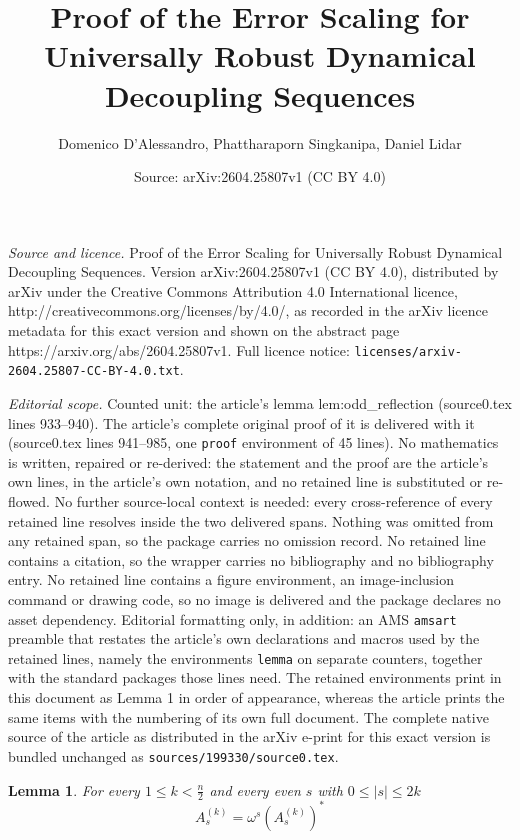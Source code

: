\documentclass[10pt,a4paper]{amsart}
\title{Proof of the Error Scaling for Universally Robust Dynamical Decoupling Sequences}
\author{Domenico D'Alessandro, Phattharaporn Singkanipa, Daniel Lidar}
\date{Source: arXiv:2604.25807v1 (CC BY 4.0)}
\newtheorem{lemma}{Lemma}
\newcommand{\beq}{\begin{equation}}
\newcommand{\eeq}{\end{equation}}
\begin{document}
\maketitle

\noindent\emph{Source and licence.} Proof of the Error Scaling for Universally Robust Dynamical Decoupling Sequences. Version arXiv:2604.25807v1 (CC BY 4.0), distributed by arXiv under the Creative Commons Attribution 4.0 International licence, http://creativecommons.org/licenses/by/4.0/, as recorded in the arXiv licence metadata for this exact version and shown on the abstract page https://arxiv.org/abs/2604.25807v1. Full licence notice: \texttt{licenses/arxiv-2604.25807-CC-BY-4.0.txt}.\par\smallskip

\noindent\textit{Editorial scope.} Counted unit: the article's lemma lem:odd\_reflection (source0.tex lines 933--940). The article's complete original proof of it is delivered with it (source0.tex lines 941--985, one \texttt{proof} environment of 45 lines). No mathematics is written, repaired or re-derived: the statement and the proof are the article's own lines, in the article's own notation, and no retained line is substituted or re-flowed.  No further source-local context is needed: every cross-reference of every retained line resolves inside the two delivered spans.  Nothing was omitted from any retained span, so the package carries no omission record.  No retained line contains a citation, so the wrapper carries no bibliography and no bibliography entry.  No retained line contains a figure environment, an image-inclusion command or drawing code, so no image is delivered and the package declares no asset dependency.  Editorial formatting only, in addition: an AMS \texttt{amsart} preamble that restates the article's own declarations and macros used by the retained lines, namely the environments \texttt{lemma} on separate counters, together with the standard packages those lines need.  The retained environments print in this document as Lemma 1 in order of appearance, whereas the article prints the same items with the numbering of its own full document.  The complete native source of the article as distributed in the arXiv e-print for this exact version is bundled unchanged as \texttt{sources/199330/source0.tex}.
\begin{lemma}\label{lem:odd_reflection}
For every $1 \leq k < \frac{n}{2}$ and every even $s$ with $0\leq |s|
 \leq 2k$ 
\beq
A_s^{(k)}=\omega^s (A_s^{(k)})^{*}
\label{eq1}
\eeq
\end{lemma}
\end{document}
